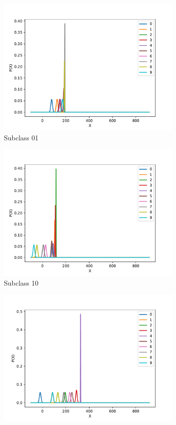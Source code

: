 \documentclass[12pt,a4paper]{report}
\begin{document}
\begin{figure}[H]
\begin{subfigure}{.49\textwidth}
  \includegraphics[width=1\linewidth]{4_01}
  \caption{Subclass 01}
  \label{fig:sub2}
\end{subfigure}
\begin{subfigure}{.49\textwidth}
  \centering
  \includegraphics[width=1\linewidth]{4_10}
  \caption{Subclass 10}
  \label{fig:sub3}
\end{subfigure}
\begin{subfigure}{.49\textwidth}
  \centering
  \includegraphics[width=1\linewidth]{4_11}

\end{subfigure}
\end{figure}
\end{document}
